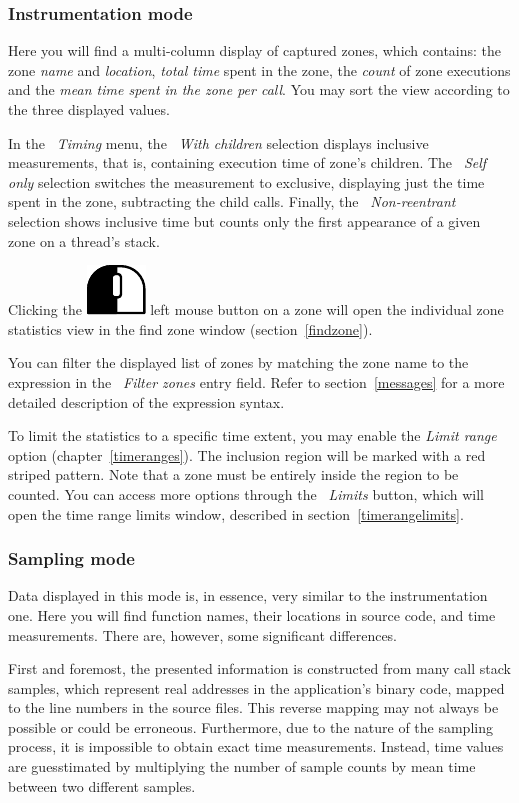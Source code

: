 \documentclass[hidelinks,titlepage,a4paper]{article}
\newcommand{\LMB}{\includegraphics[height=.8\baselineskip]{icons/lmb}}
\begin{document}
\subsubsection{Instrumentation mode}

Here you will find a multi-column display of captured zones, which contains: the zone \emph{name} and \emph{location}, \emph{total time} spent in the zone, the \emph{count} of zone executions and the \emph{mean time spent in the zone per call}. You may sort the view according to the three displayed values.

In the \emph{~Timing} menu, the \emph{~With children} selection displays inclusive measurements, that is, containing execution time of zone's children. The \emph{~Self only} selection switches the measurement to exclusive, displaying just the time spent in the zone, subtracting the child calls. Finally, the \emph{~Non-reentrant} selection shows inclusive time but counts only the first appearance of a given zone on a thread's stack.

Clicking the \LMB{} left mouse button on a zone will open the individual zone statistics view in the find zone window (section~\ref{findzone}).

You can filter the displayed list of zones by matching the zone name to the expression in the \emph{\faFilter{}~Filter zones} entry field. Refer to section~\ref{messages} for a more detailed description of the expression syntax.

To limit the statistics to a specific time extent, you may enable the \emph{Limit range} option (chapter~\ref{timeranges}). The inclusion region will be marked with a red striped pattern. Note that a zone must be entirely inside the region to be counted. You can access more options through the \emph{\faRuler{}~Limits} button, which will open the time range limits window, described in section~\ref{timerangelimits}.

\subsubsection{Sampling mode}
\label{statisticssampling}

Data displayed in this mode is, in essence, very similar to the instrumentation one. Here you will find function names, their locations in source code, and time measurements. There are, however, some significant differences.

First and foremost, the presented information is constructed from many call stack samples, which represent real addresses in the application's binary code, mapped to the line numbers in the source files. This reverse mapping may not always be possible or could be erroneous. Furthermore, due to the nature of the sampling process, it is impossible to obtain exact time measurements. Instead, time values are guesstimated by multiplying the number of sample counts by mean time between two different samples.
\end{document}
